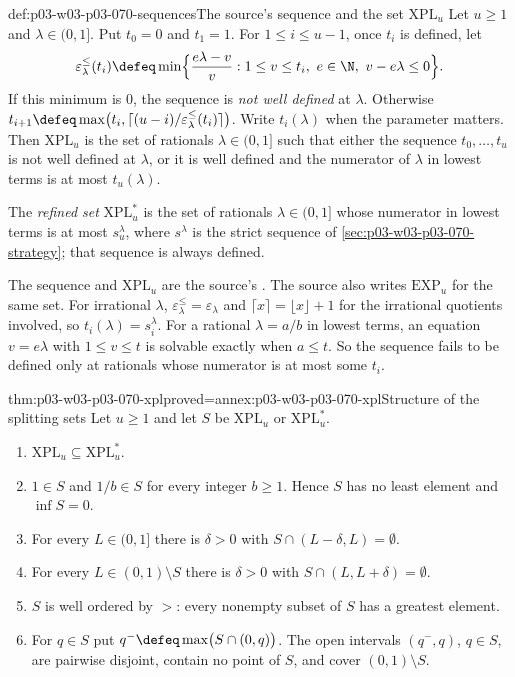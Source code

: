 \begin{hbdefinition}{def:p03-w03-p03-070-sequences}{The source's sequence and the set \(\mathrm{XPL}_u\)}
Let \(u\geq1\) and \(\lambda\in(0,1]\).  Put \(t_0=0\) and \(t_1=1\).  For
\(1\leq i\leq u-1\), once \(t_i\) is defined, let
\[
  \varepsilon^{\leq}_\lambda(t_i)\defeq\min\Bigl\{\frac{e\lambda-v}{v}:
  1\leq v\leq t_i,\ e\in\N,\ v-e\lambda\leq0\Bigr\}.
\]
If this minimum is \(0\), the sequence is \emph{not well defined} at
\(\lambda\).  Otherwise
\(t_{i+1}\defeq\max\bigl(t_i,\lceil(u-i)/\varepsilon^{\leq}_\lambda(t_i)\rceil\bigr)\).
Write \(t_i(\lambda)\) when the parameter matters.  Then
\(\mathrm{XPL}_u\) is the set of rationals \(\lambda\in(0,1]\) such that
either the sequence \(t_0,\ldots,t_u\) is not well defined at \(\lambda\),
or it is well defined and the numerator of \(\lambda\) in lowest terms is at
most \(t_u(\lambda)\).

The \emph{refined set} \(\mathrm{XPL}^\ast_u\) is the set of rationals
\(\lambda\in(0,1]\) whose numerator in lowest terms is at most
\(s^\lambda_u\), where \(s^\lambda\) is the strict sequence of
\cref{sec:p03-w03-p03-070-strategy}; that sequence is always defined.
\end{hbdefinition}

The sequence and \(\mathrm{XPL}_u\) are the source's
\cite[pp.~18--19]{Spencer2007LogicRandomStructuresAuthor}.  The source also
writes \(\mathrm{EXP}_u\) for the same set.  For irrational \(\lambda\),
\(\varepsilon^{\leq}_\lambda=\varepsilon_\lambda\) and
\(\lceil x\rceil=\lfloor x\rfloor+1\) for the irrational quotients involved,
so \(t_i(\lambda)=s^\lambda_i\).  For a rational \(\lambda=a/b\) in lowest
terms, an equation \(v=e\lambda\) with \(1\leq v\leq t\) is solvable exactly
when \(a\leq t\).  So the sequence fails to be defined only at rationals whose
numerator is at most some \(t_i\).

\begin{hbtheorem}{thm:p03-w03-p03-070-xpl}{proved=annex:p03-w03-p03-070-xpl}{Structure of the splitting sets}
Let \(u\geq1\) and let \(S\) be \(\mathrm{XPL}_u\) or \(\mathrm{XPL}^\ast_u\).
\begin{enumerate}
\item \(\mathrm{XPL}_u\subseteq\mathrm{XPL}^\ast_u\).
\item \(1\in S\) and \(1/b\in S\) for every integer \(b\geq1\).  Hence \(S\)
      has no least element and \(\inf S=0\).
\item For every \(L\in(0,1]\) there is \(\delta>0\) with
      \(S\cap(L-\delta,L)=\emptyset\).
\item For every \(L\in(0,1)\setminus S\) there is \(\delta>0\) with
      \(S\cap(L,L+\delta)=\emptyset\).
\item \(S\) is well ordered by \(>\): every nonempty subset of \(S\) has a
      greatest element.
\item For \(q\in S\) put \(q^-\defeq\max\bigl(S\cap(0,q)\bigr)\).  The open
      intervals \((q^-,q)\), \(q\in S\), are pairwise disjoint, contain no
      point of \(S\), and cover \((0,1)\setminus S\).
\end{enumerate}
\end{hbtheorem}

